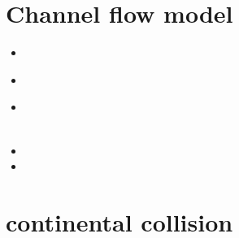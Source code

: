 \section{Channel flow model} 

\begin{small}
\begin{itemize}
\item[\twothousand] 
\item[\twothousandfour] 
 \\
\item[\twothousandsix] 
 \\
 \\
\item[\twothousandseven] 
\item[\twothousandeleven] 
\end{itemize}
\end{small}

\section{continental collision} 

